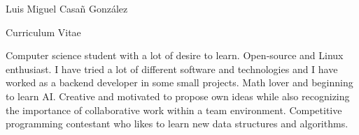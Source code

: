 \documentclass[10pt]{curriculum}
\begin{document}
\begin{center}
	{\sffamily\Huge Luis Miguel Casañ González}
	
	\medskip
	
	{\Huge{Curriculum Vitae}}
\end{center}

Computer science student with a lot of desire to learn. Open‑source and Linux enthusiast. I have tried a
lot of different software and technologies and I have worked as a backend developer in some small projects.
Math lover and beginning to learn AI. Creative and motivated to propose own ideas while also recognizing
the importance of collaborative work within a team environment. Competitive programming contestant
who likes to learn new data structures and algorithms.
\begin{paracol}{2} %


%	
%	
%	
%	







\end{paracol}
\end{document}
